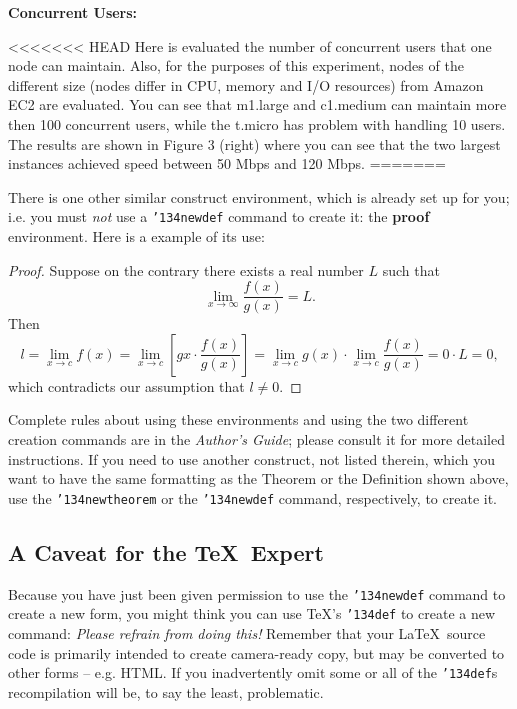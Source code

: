 \documentclass{acm_proc_article-sp}
\begin{document}
\textbf{Concurrent Users:}

<<<<<<< HEAD
Here is evaluated the number of concurrent users that one node can maintain. Also, for the purposes of this experiment, nodes of the different size (nodes differ in CPU, memory and I/O resources) from Amazon EC2 are evaluated. You can see that m1.large and c1.medium can maintain more then 100 concurrent users, while the t.micro has problem with handling 10 users. The results are shown in Figure 3 (right) where you can see that the two largest instances achieved speed between 50 Mbps and 120 Mbps.\cite{cite2}
=======
 
There is one other similar construct environment, which is
already set up
for you; i.e. you must \textit{not} use
a \texttt{{\char'134}newdef} command to
create it: the \textbf{proof} environment.  Here
is a example of its use:
\begin{proof}
Suppose on the contrary there exists a real number $L$ such that
\begin{displaymath}
\lim_{x\rightarrow\infty} \frac{f(x)}{g(x)} = L.
\end{displaymath}
Then
\begin{displaymath}
l=\lim_{x\rightarrow c} f(x)
= \lim_{x\rightarrow c}
\left[ g{x} \cdot \frac{f(x)}{g(x)} \right ]
= \lim_{x\rightarrow c} g(x) \cdot \lim_{x\rightarrow c}
\frac{f(x)}{g(x)} = 0\cdot L = 0,
\end{displaymath}
which contradicts our assumption that $l\neq 0$.
\end{proof}

Complete rules about using these environments and using the
two different creation commands are in the
\textit{Author's Guide}; please consult it for more
detailed instructions.  If you need to use another construct,
not listed therein, which you want to have the same
formatting as the Theorem
or the Definition\cite{salas:calculus} shown above,
use the \texttt{{\char'134}newtheorem} or the
\texttt{{\char'134}newdef} command,
respectively, to create it.

\subsection*{A {\secit Caveat} for the \TeX\ Expert}
Because you have just been given permission to
use the \texttt{{\char'134}newdef} command to create a
new form, you might think you can
use \TeX's \texttt{{\char'134}def} to create a
new command: \textit{Please refrain from doing this!}
Remember that your \LaTeX\ source code is primarily intended
to create camera-ready copy, but may be converted
to other forms -- e.g. HTML. If you inadvertently omit
some or all of the \texttt{{\char'134}def}s recompilation will
be, to say the least, problematic.
\end{document}

